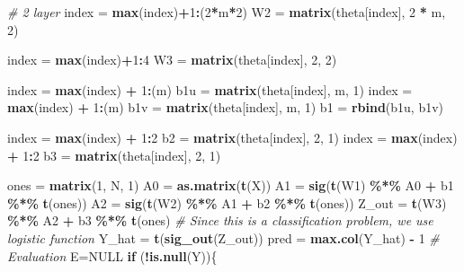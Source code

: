 \documentclass[12pt,halfline,a4paper,]{ouparticle}
\newenvironment{Shaded}{\begin{snugshade}}{\end{snugshade}}
\newcommand{\CommentTok}[1]{\textcolor[rgb]{0.56,0.35,0.01}{\textit{#1}}}
\newcommand{\ConstantTok}[1]{\textcolor[rgb]{0.56,0.35,0.01}{#1}}
\newcommand{\ControlFlowTok}[1]{\textcolor[rgb]{0.13,0.29,0.53}{\textbf{#1}}}
\newcommand{\DecValTok}[1]{\textcolor[rgb]{0.00,0.00,0.81}{#1}}
\newcommand{\FunctionTok}[1]{\textcolor[rgb]{0.13,0.29,0.53}{\textbf{#1}}}
\newcommand{\NormalTok}[1]{#1}
\newcommand{\OtherTok}[1]{\textcolor[rgb]{0.56,0.35,0.01}{#1}}
\newcommand{\SpecialCharTok}[1]{\textcolor[rgb]{0.81,0.36,0.00}{\textbf{#1}}}
\begin{document}
\begin{Shaded}
\begin{Highlighting}[]
  \CommentTok{\# 2 layer}
\NormalTok{  index }\OtherTok{=} \FunctionTok{max}\NormalTok{(index)}\SpecialCharTok{+}\DecValTok{1}\SpecialCharTok{:}\NormalTok{(}\DecValTok{2}\SpecialCharTok{*}\NormalTok{m}\SpecialCharTok{*}\DecValTok{2}\NormalTok{) }
\NormalTok{  W2 }\OtherTok{=} \FunctionTok{matrix}\NormalTok{(theta[index], }\DecValTok{2} \SpecialCharTok{*}\NormalTok{ m, }\DecValTok{2}\NormalTok{)}

  
\NormalTok{  index }\OtherTok{=} \FunctionTok{max}\NormalTok{(index)}\SpecialCharTok{+}\DecValTok{1}\SpecialCharTok{:}\DecValTok{4}
\NormalTok{  W3 }\OtherTok{=} \FunctionTok{matrix}\NormalTok{(theta[index], }\DecValTok{2}\NormalTok{, }\DecValTok{2}\NormalTok{)}

\NormalTok{  index }\OtherTok{=} \FunctionTok{max}\NormalTok{(index) }\SpecialCharTok{+} \DecValTok{1}\SpecialCharTok{:}\NormalTok{(m)}
\NormalTok{  b1u }\OtherTok{=} \FunctionTok{matrix}\NormalTok{(theta[index], m, }\DecValTok{1}\NormalTok{)}
\NormalTok{  index }\OtherTok{=} \FunctionTok{max}\NormalTok{(index) }\SpecialCharTok{+} \DecValTok{1}\SpecialCharTok{:}\NormalTok{(m)}
\NormalTok{  b1v }\OtherTok{=} \FunctionTok{matrix}\NormalTok{(theta[index], m, }\DecValTok{1}\NormalTok{)}
\NormalTok{  b1 }\OtherTok{=} \FunctionTok{rbind}\NormalTok{(b1u, b1v)}
  
\NormalTok{  index }\OtherTok{=} \FunctionTok{max}\NormalTok{(index) }\SpecialCharTok{+} \DecValTok{1}\SpecialCharTok{:}\DecValTok{2}
\NormalTok{  b2 }\OtherTok{=} \FunctionTok{matrix}\NormalTok{(theta[index], }\DecValTok{2}\NormalTok{, }\DecValTok{1}\NormalTok{)}
\NormalTok{  index }\OtherTok{=} \FunctionTok{max}\NormalTok{(index) }\SpecialCharTok{+} \DecValTok{1}\SpecialCharTok{:}\DecValTok{2}
\NormalTok{  b3 }\OtherTok{=} \FunctionTok{matrix}\NormalTok{(theta[index], }\DecValTok{2}\NormalTok{, }\DecValTok{1}\NormalTok{)}
  
\NormalTok{  ones }\OtherTok{=} \FunctionTok{matrix}\NormalTok{(}\DecValTok{1}\NormalTok{, N, }\DecValTok{1}\NormalTok{)}
\NormalTok{  A0 }\OtherTok{=} \FunctionTok{as.matrix}\NormalTok{(}\FunctionTok{t}\NormalTok{(X))}
\NormalTok{  A1 }\OtherTok{=} \FunctionTok{sig}\NormalTok{(}\FunctionTok{t}\NormalTok{(W1) }\SpecialCharTok{\%*\%}\NormalTok{ A0 }\SpecialCharTok{+}\NormalTok{ b1 }\SpecialCharTok{\%*\%} \FunctionTok{t}\NormalTok{(ones))}
\NormalTok{  A2 }\OtherTok{=} \FunctionTok{sig}\NormalTok{(}\FunctionTok{t}\NormalTok{(W2) }\SpecialCharTok{\%*\%}\NormalTok{ A1 }\SpecialCharTok{+}\NormalTok{ b2 }\SpecialCharTok{\%*\%} \FunctionTok{t}\NormalTok{(ones))}
\NormalTok{  Z\_out }\OtherTok{=} \FunctionTok{t}\NormalTok{(W3) }\SpecialCharTok{\%*\%}\NormalTok{ A2 }\SpecialCharTok{+}\NormalTok{ b3 }\SpecialCharTok{\%*\%} \FunctionTok{t}\NormalTok{(ones)}
  \CommentTok{\# Since this is a classification problem, we use logistic function}
\NormalTok{  Y\_hat }\OtherTok{=} \FunctionTok{t}\NormalTok{(}\FunctionTok{sig\_out}\NormalTok{(Z\_out))}
\NormalTok{  pred }\OtherTok{=} \FunctionTok{max.col}\NormalTok{(Y\_hat) }\SpecialCharTok{{-}} \DecValTok{1}
  \CommentTok{\# Evaluation}
\NormalTok{  E}\OtherTok{=}\ConstantTok{NULL}
  \ControlFlowTok{if}\NormalTok{ (}\SpecialCharTok{!}\FunctionTok{is.null}\NormalTok{(Y))\{}


\end{Highlighting}
\end{Shaded}
\end{document}
